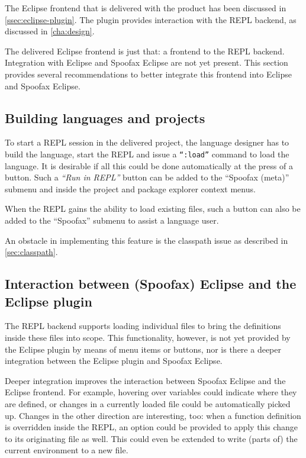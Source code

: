 The Eclipse frontend that is delivered with the product has been discussed in
\cref{ssec:eclipse-plugin}. The plugin provides interaction with the REPL
backend, as discussed in \cref{cha:design}.

The delivered Eclipse frontend is just that: a frontend to the REPL backend.
Integration with Eclipse and Spoofax Eclipse are not yet present. This
section provides several recommendations to better integrate this frontend
into Eclipse and Spoofax Eclipse.

\subsection{Building languages and projects}

To start a REPL session in the delivered project, the language designer has to
build the language, start the REPL and issue a \texttt{``:load''} command to
load the language. It is desirable if all this could be done automatically at
the press of a button. Such a \textit{``Run in REPL''} button can be added to the
``Spoofax (meta)'' submenu and inside the project and package explorer context
menus.

When the REPL gains the ability to load existing files, such a button can also
be added to the ``Spoofax'' submenu to assist a language user.

An obstacle in implementing this feature is the classpath issue as described in
\cref{sec:classpath}.

\subsection{Interaction between (Spoofax) Eclipse and the Eclipse plugin}

The REPL backend supports loading individual files to bring the definitions
inside these files into scope. This functionality, however, is not yet provided
by the Eclipse plugin by means of menu items or buttons, nor is there a deeper integration
between the Eclipse plugin and Spoofax Eclipse.

Deeper integration improves the interaction between Spoofax Eclipse and the
Eclipse frontend. For example, hovering over variables could indicate where they are defined, or
changes in a currently loaded file could be automatically picked up. Changes in
the other direction are interesting, too: when a function definition is overridden
inside the REPL, an option could be provided to apply this change to its
originating file as well. This could even be extended to write (parts of) the current
environment to a new file.


